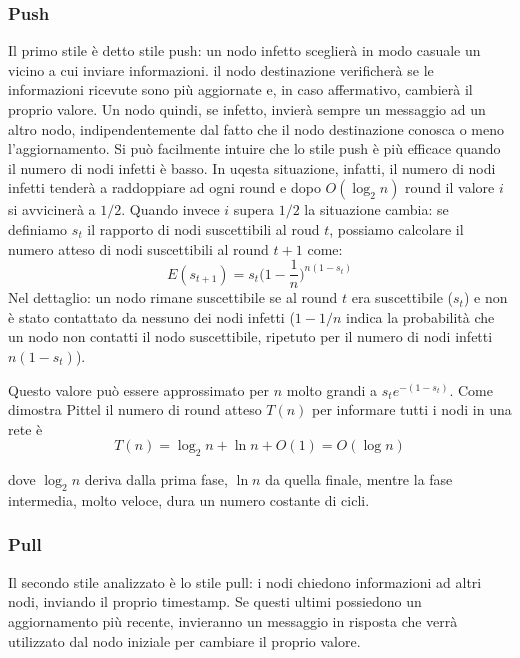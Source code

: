 \subsubsection{Push}
Il primo stile è detto stile push: un nodo infetto sceglierà in modo casuale un vicino a cui inviare informazioni. il nodo destinazione verificherà se le informazioni ricevute sono più aggiornate e, in caso affermativo, cambierà il proprio valore. Un nodo quindi, se infetto, invierà sempre un messaggio ad un altro nodo, indipendentemente dal fatto che il nodo destinazione conosca o meno l'aggiornamento. Si può facilmente intuire che lo stile push è più efficace quando il numero di nodi infetti è basso. In uqesta situazione, infatti, il numero di nodi infetti tenderà a raddoppiare ad ogni round e dopo $O(\log_2 n)$ round il valore $i$ si avvicinerà a $1/2$. Quando invece $i$ supera $1/2$ la situazione cambia: se definiamo $s_t$ il rapporto di nodi suscettibili al roud $t$, possiamo calcolare il numero atteso di nodi suscettibili al round $t + 1$ come:
\begin{equation}
    E(s_{t + 1}) = s_t  \Big(1 - \frac{1}{n}\Big)^{n(1-s_t)}
\end{equation}
Nel dettaglio: un nodo rimane suscettibile se al round $t$ era suscettibile ($s_t$) e non è stato contattato da nessuno dei nodi infetti ($1-1/n$ indica la probabilità che un nodo non contatti il nodo suscettibile, ripetuto per il numero di nodi infetti $n(1-s_t)$).

Questo valore può essere approssimato per $n$ molto grandi a $s_t e^{-(1-s_t)}$. Come dimostra Pittel \cite{pittel} il numero di round atteso $T(n)$ per informare tutti i nodi in una rete è
\begin{equation}
    T(n)= \log_2 n + \ln n + O(1) = O(\log n)
\end{equation}

dove $\log_2 n$ deriva dalla prima fase, $\ln n$ da quella finale, mentre la fase intermedia, molto veloce, dura un numero costante di cicli.
\subsubsection{Pull}
Il secondo stile analizzato è lo stile pull: i nodi chiedono informazioni ad altri nodi, inviando il proprio timestamp. Se questi ultimi possiedono un aggiornamento più recente, invieranno un messaggio in risposta che verrà utilizzato dal nodo iniziale per cambiare il proprio valore.

